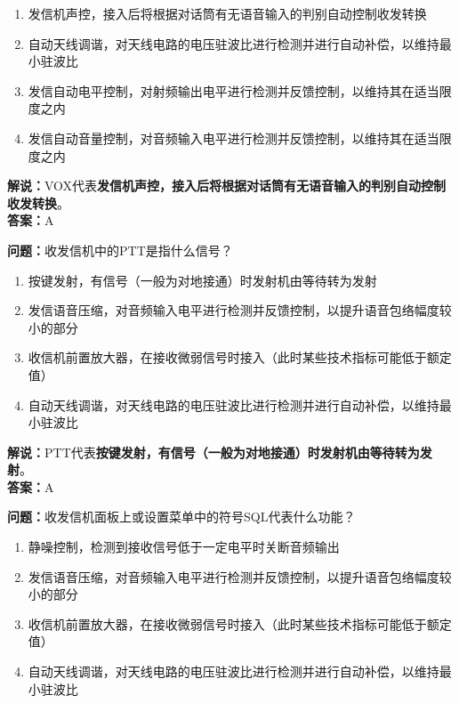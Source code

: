 \begin{enumerate}[label=\Alph*), leftmargin=1cm]
	\item 发信机声控，接入后将根据对话筒有无语音输入的判别自动控制收发转换
	\item 自动天线调谐，对天线电路的电压驻波比进行检测并进行自动补偿，以维持最小驻波比
	\item 发信自动电平控制，对射频输出电平进行检测并反馈控制，以维持其在适当限度之内
	\item 发信自动音量控制，对音频输入电平进行检测并反馈控制，以维持其在适当限度之内
\end{enumerate}

\textbf{解说：}VOX代表\textbf{发信机声控，接入后将根据对话筒有无语音输入的判别自动控制收发转换}。\\\textbf{答案：}A%



\textbf{问题：}收发信机中的PTT是指什么信号？

\begin{enumerate}[label=\Alph*), leftmargin=1cm]
	\item 按键发射，有信号（一般为对地接通）时发射机由等待转为发射
	\item 发信语音压缩，对音频输入电平进行检测并反馈控制，以提升语音包络幅度较小的部分
	\item 收信机前置放大器，在接收微弱信号时接入（此时某些技术指标可能低于额定值）
	\item 自动天线调谐，对天线电路的电压驻波比进行检测并进行自动补偿，以维持最小驻波比
\end{enumerate}

\textbf{解说：}PTT代表\textbf{按键发射，有信号（一般为对地接通）时发射机由等待转为发射}。\\\textbf{答案：}A%



\textbf{问题：}收发信机面板上或设置菜单中的符号SQL代表什么功能？

\begin{enumerate}[label=\Alph*), leftmargin=1cm]
	\item 静噪控制，检测到接收信号低于一定电平时关断音频输出
	\item 发信语音压缩，对音频输入电平进行检测并反馈控制，以提升语音包络幅度较小的部分
	\item 收信机前置放大器，在接收微弱信号时接入（此时某些技术指标可能低于额定值）
	\item 自动天线调谐，对天线电路的电压驻波比进行检测并进行自动补偿，以维持最小驻波比
\end{enumerate}

